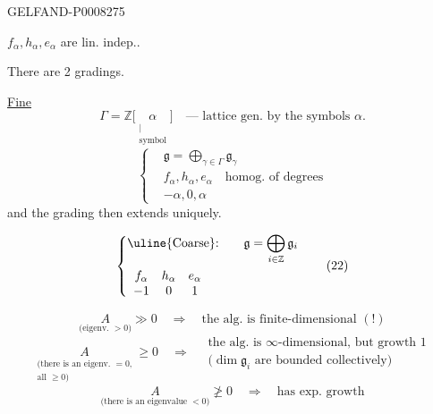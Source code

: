 \begin{GelfandAdjacentEvidence}{GELFAND-P000827}{5}


\(f_\alpha,h_\alpha,e_\alpha\) are lin. indep..

There are 2 gradings.

\uline{Fine}
\[
\Gamma=\mathbb{Z}\biggl[
\underset{\substack{\vert\\\text{symbol}}}{\alpha}\biggr]
\quad\text{— lattice gen. by the symbols }\alpha.
\]
\begin{equation*}
\left\{\begin{aligned}
 &\mathfrak g=\bigoplus_{\gamma\in\Gamma}\mathfrak g_\gamma\\
 &f_\alpha,h_\alpha,e_\alpha\quad\text{homog. of degrees}\\
 &-\alpha,0,\alpha
\end{aligned}\right.\tag{21}
\end{equation*}
and the grading then extends uniquely.

\begin{equation*}
\left\{\begin{aligned}
 &\text{\uline{Coarse}:}\qquad
 \mathfrak g=\bigoplus_{i\in\mathbb{Z}}\mathfrak g_i\\
 &\begin{array}{ccc}
 f_\alpha&h_\alpha&e_\alpha\\
 -1&0&1
 \end{array}
\end{aligned}\right.\tag{22}
\end{equation*}

\begin{equation*}
\underset{\text{(eigenv. \(>0\))}}{A}\gg0
\quad\Rightarrow\quad\text{the alg. is finite-dimensional }(!)
\tag{23}
\end{equation*}
\begin{equation*}
\underset{\substack{\text{(there is an eigenv. \(=0\),}\\
\text{all \(\ge0\))}}}{A}\ge0
\quad\Rightarrow\quad
\begin{gathered}
\text{the alg. is \(\infty\)-dimensional, but growth 1}\\
\text{(\(\dim\mathfrak g_i\) are bounded collectively)}
\end{gathered}\tag{24}
\end{equation*}
\begin{equation*}
\underset{\text{(there is an eigenvalue \(<0\))}}{A}\not\ge0
\quad\Rightarrow\quad\text{has exp. growth}
\tag{25}
\end{equation*}
\end{GelfandAdjacentEvidence}



